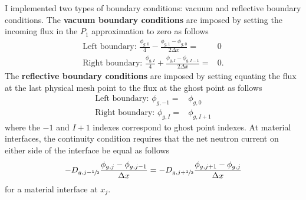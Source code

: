 I implemented two types of boundary conditions: vacuum and reflective boundary conditions. The
\textbf{vacuum boundary conditions} are imposed by setting the incoming flux in the $P_1$
approximation to zero as follows
%
\begin{align}
  \mbox{Left boundary: } \frac{\phi_{g,0}}{4}-\frac{\phi_{g,1}-\phi_{g,0}}{2\Delta x} =& 0 \\
  \mbox{Right boundary: } \frac{\phi_{g,I}}{4}+\frac{\phi_{g,I}-\phi_{g,I-1}}{2\Delta x} =& 0.
\end{align}
%
The \textbf{reflective boundary conditions} are imposed by setting equating the flux at the last physical
mesh point to the flux at the ghost point as follows
%
\begin{align}
  \mbox{Left boundary: } \phi_{g,-1} =& \phi_{g,0} \\
  \mbox{Right boundary: } \phi_{g,I} =& \phi_{g,I+1}
\end{align}
%
where the $-1$ and $I+1$ indexes correspond to ghost point indexes. At material interfaces,
the continuity condition requires that the net neutron current on either side of the interface be
equal as follows
%
\begin{align}
  -D_{g,j-\sfrac{1}{2}}\frac{\phi_{g,j}-\phi_{g,j-1}}{\Delta x} = -D_{g,j+\sfrac{1}{2}}
  \frac{\phi_{g,j+1}-\phi_{g,j}}{\Delta x} \label{eq:itf-bc}
\end{align}
%
for a material interface at $x_j$.

